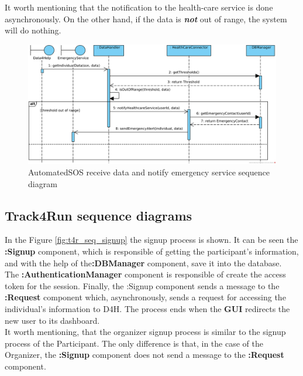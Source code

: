 \documentclass[a4paper, hidelinks, 12pt]{report}
\begin{document}
\begin{itemize}
	It worth mentioning that the notification to the health-care service is done asynchronously. On the other hand, if the data is \textit{\textbf{not}} out of range, the system will do nothing.
	
	\begin{figure}[H]
		\centering
		\includegraphics[width=1\textwidth]{diagrams/sequence_diagrams/asos_receive_individual_data_and_notify_emergency_service.png}
		\caption[AutomatedSOS receive data and notify emergency service sequence diagram]{AutomatedSOS receive data and notify emergency service sequence diagram}
		\label{fig:asos_seq_receive_data}
	\end{figure}
	
	\subsection{Track4Run sequence diagrams}
	In the Figure \ref{fig:t4r_seq_signup} the signup process is shown. It can be seen the \textbf{:Signup} component, which is responsible of getting the participant's information, and with the help of the\textbf{:DBManager} component, save it into the database. \\ The \textbf{:AuthenticationManager} component is responsible of create the access token for the session. Finally, the :Signup component sends a message to the \textbf{:Request} component which, asynchronously,  sends a request for accessing the individual's information to D4H. The process ends when the \textbf{GUI} redirects the new user to its dashboard.\\
	
	It worth mentioning, that the organizer signup process is similar to the signup process of the Participant. The only difference is that, in the case of the Organizer, the \textbf{:Signup} component does not send a message to the \textbf{:Request }component.\\
	

\end{itemize}
\end{document}
